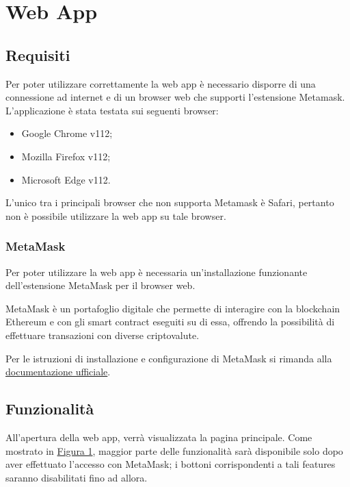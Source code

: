 \section{Web App}

\subsection{Requisiti}
Per poter utilizzare correttamente la web app è necessario disporre di una connessione ad internet e di un browser web che supporti l'estensione Metamask. L'applicazione è stata testata sui seguenti browser:
\begin{itemize}
    \item Google Chrome v112;
    \item Mozilla Firefox v112;
    \item Microsoft Edge v112.
\end{itemize}
L'unico tra i principali browser che non supporta Metamask è Safari, pertanto non è possibile utilizzare la web app su tale browser.

\subsubsection{MetaMask}
Per poter utilizzare la web app è necessaria un'installazione funzionante dell'estensione MetaMask per il browser web.

MetaMask è un portafoglio digitale che permette di interagire con la blockchain Ethereum e con gli smart contract eseguiti su di essa, offrendo la possibilità di effettuare transazioni con diverse criptovalute.

Per le istruzioni di installazione e configurazione di MetaMask si rimanda alla \href{https://support.metamask.io/hc/en-us/articles/360015489531-Getting-started-with-MetaMask}{documentazione ufficiale}.

\subsection{Funzionalità}
All'apertura della web app, verrà visualizzata la pagina principale. Come mostrato in \hyperref[fig:home]{Figura 1}, maggior parte delle funzionalità sarà disponibile solo dopo aver effettuato l'accesso con MetaMask; i bottoni corrispondenti a tali features saranno disabilitati fino ad allora.

